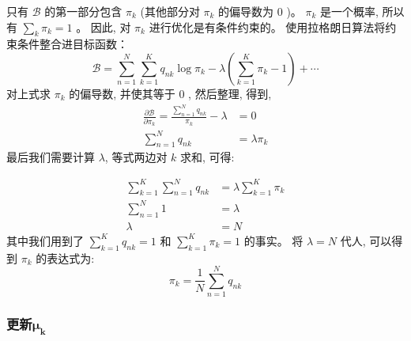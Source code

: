 \documentclass[UTF8]{ctexart}
\numberwithin{equation}{section}
\begin{document}
只有 $\mathcal{B}$ 的第一部分包含 $\pi_{k}$ (其他部分对 
$\pi_{k}$ 的偏导数为 0 )。 $\pi_{k}$ 是一个概率, 所以有 $\sum_{k} \pi_{k}=1$ 。
因此, 对 $\pi_{k}$ 进行优化是有条件约束的。
使用拉格朗日算法将约束条件整合进目标函数：
\begin{equation}
    \mathcal{B}=\sum_{n=1}^{N} \sum_{k=1}^{K} q_{n k} \log \pi_{k}-\lambda\left(\sum_{k=1}^{K} \pi_{k}-1\right)+\cdots
\end{equation}
对上式求 $\pi_{k}$ 的偏导数, 并使其等于 0 , 然后整理, 得到,
$$
\begin{aligned}
\frac{\partial \mathcal{B}}{\partial \pi_{k}}=\frac{\sum_{n=1}^{N} q_{n k}}{\pi_{k}}-\lambda &=0 \\
\sum_{n=1}^{N} q_{n k} &=\lambda \pi_{k}
\end{aligned}
$$
最后我们需要计算 $\lambda$, 等式两边对 $k$ 求和, 可得:

$$
\begin{aligned}
\sum_{k=1}^{K} \sum_{n=1}^{N} q_{n k} &=\lambda \sum_{k=1}^{K} \pi_{k} \\
\sum_{n=1}^{N} 1 &=\lambda \\
\lambda &=N
\end{aligned}
$$
其中我们用到了 $\sum_{k=1}^{K} q_{n k}=1$ 
和 $\sum_{k=1}^{K} \pi_{k}=1$ 的事实。
将 $\lambda=N$ 代人, 可以得到 $\pi_{k}$ 的表达式为:
\begin{equation}
    \pi_{k}=\frac{1}{N} \sum_{n=1}^{N} q_{n k}
\end{equation}

\subsubsection{更新$\boldsymbol{\mu_k}$}
\end{document}
